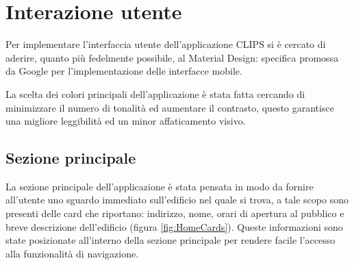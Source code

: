 \documentclass[../Sperimentazione.tex]{subfiles}
\begin{document}
	\section{Interazione utente}
		Per implementare l'interfaccia utente dell'applicazione CLIPS si è cercato di aderire, quanto più fedelmente possibile, al Material Design: specifica promossa da Google per l'implementazione delle interfacce mobile.
		
		La scelta dei colori principali dell'applicazione è stata fatta cercando di minimizzare il numero di tonalità ed aumentare il contrasto, questo garantisce una migliore leggibilità ed un minor affaticamento visivo.

		\subsection{Sezione principale}
			La sezione principale dell'applicazione è stata pensata in modo da fornire all'utente uno sguardo immediato sull'edificio nel quale si trova, a tale scopo sono presenti delle card che riportano: indirizzo, nome, orari di apertura al pubblico e breve descrizione dell'edificio (figura \ref{fig:HomeCards}). Queste informazioni sono state posizionate all'interno della sezione principale per rendere facile l'accesso alla funzionalità di navigazione. 
			
\end{document}
